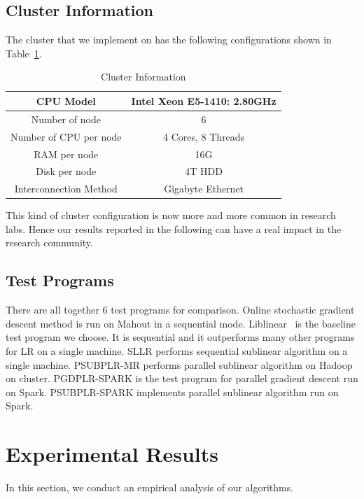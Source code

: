 \documentclass[10pt, conference, compsocconf]{IEEEtran}
\begin{document}
\subsection{Cluster Information}
The cluster that we implement on has the following configurations shown in Table~\ref{tab:table2}.
\begin{table}[h]
\centering
\caption{Cluster Information}\label{tab:table2}
\begin{tabular}{|c|c|}
\hline
    CPU Model & Intel Xeon E5-1410: 2.80GHz \\
\hline
    Number of node & 6 \\
\hline
    Number of CPU per node & 4 Cores, 8 Threads \\
\hline
    RAM per node & 16G \\
\hline
    Disk per node & 4T HDD\\
\hline
    Interconnection Method & Gigabyte Ethernet  \\
\hline
\end{tabular}
\end{table}
This kind of cluster configuration is now more and more common in research labs. Hence our results reported in the following can have a real impact in the research community.

\subsection{Test Programs}
There are all together 6 test programs for comparison.
Online stochastic gradient descent method is run on Mahout in a sequential mode.
Liblinear~\cite{fan2008liblinear} is the baseline test program we choose. It is sequential and it outperforms many other programs for LR on a single machine.
SLLR performs sequential sublinear algorithm on a single machine.
PSUBPLR-MR performs parallel sublinear algorithm on Hadoop on cluster.
PGDPLR-SPARK is the test program for parallel gradient descent run on Spark.
PSUBPLR-SPARK implements parallel sublinear algorithm run on Spark.

\section{Experimental Results} \label{sec:experiment}
In this section, we conduct an empirical analysis of our algorithms.
\end{document}
